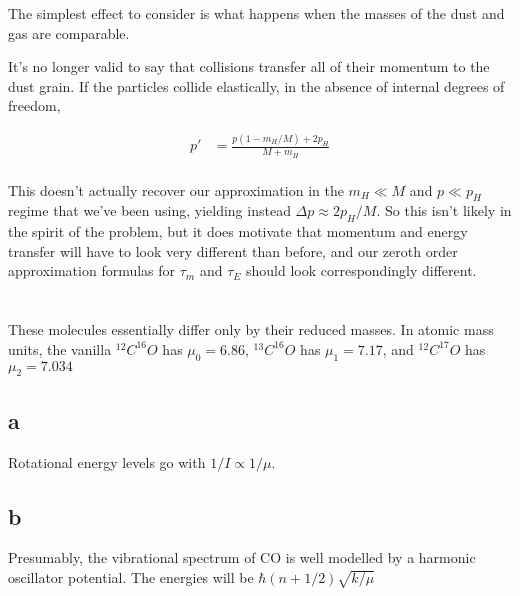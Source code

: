 \documentclass[12pt]{article}
\begin{document}
The simplest effect to consider is what happens when the masses of the dust and gas are comparable.

It's no longer valid to say that collisions transfer all of their momentum to the dust grain. If the particles collide elastically, in the absence of internal degrees of freedom,

\begin{align*}
p' &= \frac{p(1-m_H/M)+2p_H}{M+m_H} \\[11pt]
\end{align*}

This doesn't actually recover our approximation in the \(m_H \ll M\) and \(p \ll p_H\) regime that we've been using, yielding instead \(\Delta p \approx 2p_H/M \). So this isn't likely in the spirit of the problem, but it does motivate that momentum and energy transfer will have to look very different than before, and our zeroth order approximation formulas for \(\tau_m\) and \(\tau_E\) should look correspondingly different.


\section{}

These molecules essentially differ only by their reduced masses. In atomic mass units, the vanilla \({}^{12}C^{16}O\) has \(\mu_0 = 6.86\), \({}^{13}C^{16}O\) has \(\mu_1 = 7.17\), and \({}^{12}C^{17}O\) has \(\mu_2 = 7.034\) 

\subsection*{a}

Rotational energy levels go with \(1/I \propto 1/\mu\).  

\subsection*{b}

Presumably, the vibrational spectrum of CO is well modelled by a harmonic oscillator potential. The energies will be \(\hbar (n+ 1/2) \sqrt{k/\mu}\)
\end{document}
